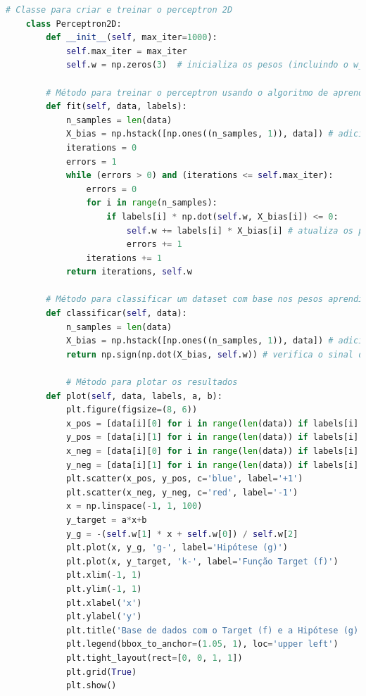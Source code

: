 \begin{lstlisting}[language=Python, caption=Perceptron, label=cod:perceptron]
    # Classe para criar e treinar o perceptron 2D
    class Perceptron2D:
        def __init__(self, max_iter=1000):
            self.max_iter = max_iter
            self.w = np.zeros(3)  # inicializa os pesos (incluindo o w_0)
        
        # Método para treinar o perceptron usando o algoritmo de aprendizagem perceptron (PLA)
        def fit(self, data, labels): 
            n_samples = len(data)
            X_bias = np.hstack([np.ones((n_samples, 1)), data]) # adiciona uma coluna de 1s para o X_0 (coordenada artificial)
            iterations = 0
            errors = 1
            while (errors > 0) and (iterations <= self.max_iter):
                errors = 0
                for i in range(n_samples):
                    if labels[i] * np.dot(self.w, X_bias[i]) <= 0:
                        self.w += labels[i] * X_bias[i] # atualiza os pesos
                        errors += 1
                iterations += 1
            return iterations, self.w
        
        # Método para classificar um dataset com base nos pesos aprendidos.
        def classificar(self, data):
            n_samples = len(data)
            X_bias = np.hstack([np.ones((n_samples, 1)), data]) # adiciona uma coluna de 1s para o bias X_0
            return np.sign(np.dot(X_bias, self.w)) # verifica o sinal do produto escalar entre x e w
        
            # Método para plotar os resultados
        def plot(self, data, labels, a, b):
            plt.figure(figsize=(8, 6))
            x_pos = [data[i][0] for i in range(len(data)) if labels[i] == 1]
            y_pos = [data[i][1] for i in range(len(data)) if labels[i] == 1]
            x_neg = [data[i][0] for i in range(len(data)) if labels[i] == -1]
            y_neg = [data[i][1] for i in range(len(data)) if labels[i] == -1]
            plt.scatter(x_pos, y_pos, c='blue', label='+1')
            plt.scatter(x_neg, y_neg, c='red', label='-1')
            x = np.linspace(-1, 1, 100)
            y_target = a*x+b
            y_g = -(self.w[1] * x + self.w[0]) / self.w[2]
            plt.plot(x, y_g, 'g-', label='Hipótese (g)')
            plt.plot(x, y_target, 'k-', label='Função Target (f)')
            plt.xlim(-1, 1)
            plt.ylim(-1, 1)
            plt.xlabel('x')
            plt.ylabel('y')
            plt.title('Base de dados com o Target (f) e a Hipótese (g)')
            plt.legend(bbox_to_anchor=(1.05, 1), loc='upper left')
            plt.tight_layout(rect=[0, 0, 1, 1])
            plt.grid(True)
            plt.show()
\end{lstlisting}


